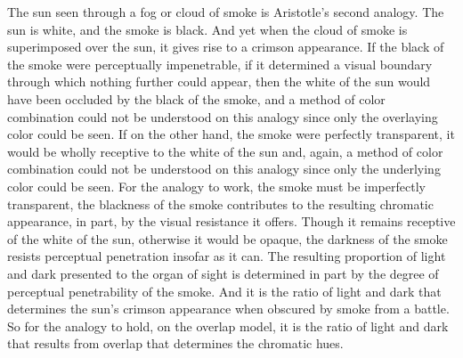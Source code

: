 The sun seen through a fog or cloud of smoke is Aristotle's second analogy. The sun is white, and the smoke is black. And yet when the cloud of smoke is superimposed over the sun, it gives rise to a crimson appearance. If the black of the smoke were perceptually impenetrable, if it determined a visual boundary through which nothing further could appear, then the white of the sun would have been occluded by the black of the smoke, and a method of color combination could not be understood on this analogy since only the overlaying color could be seen. If on the other hand, the smoke were perfectly transparent, it would be wholly receptive to the white of the sun and, again, a method of color combination could not be understood on this analogy since only the underlying color could be seen. For the analogy to work, the smoke must be imperfectly transparent, the blackness of the smoke contributes to the resulting chromatic appearance, in part, by the visual resistance it offers. Though it remains receptive of the white of the sun, otherwise it would be opaque, the darkness of the smoke resists perceptual penetration insofar as it can. The resulting proportion of light and dark presented to the organ of sight is determined in part by the degree of perceptual penetrability of the smoke. And it is the ratio of light and dark that determines the sun's crimson appearance when obscured by smoke from a battle. So for the analogy to hold, on the overlap model, it is the ratio of light and dark that results from overlap that determines the chromatic hues.

